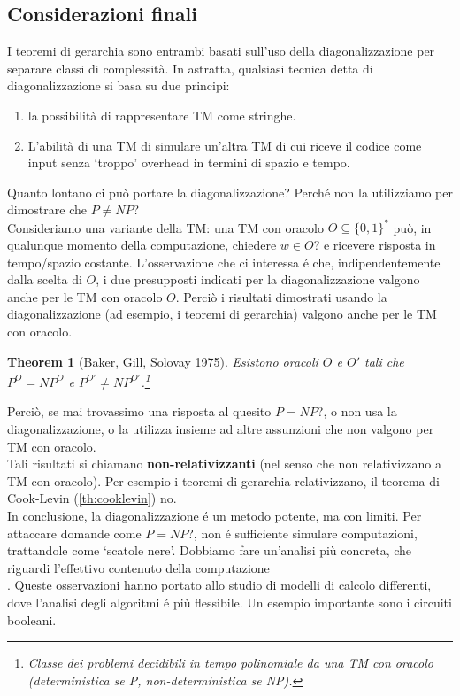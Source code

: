 \documentclass[a4paper, 12pt]{article}
\newtheorem{theorem}{Theorem}[section]
\begin{document}
\subsection{Considerazioni finali}
I teoremi di gerarchia sono entrambi basati sull’uso della diagonalizzazione per separare classi di complessità. In astratta, qualsiasi tecnica detta di diagonalizzazione si basa su due principi:
\begin{enumerate}
\item la possibilità di rappresentare TM come stringhe.
\item L’abilità di una TM di simulare un’altra TM di cui riceve il codice come input senza `troppo’ overhead in termini di spazio e tempo.
\end{enumerate}
Quanto lontano ci può portare la diagonalizzazione? Perché non la utilizziamo per dimostrare che $P \neq NP$?\\
Consideriamo una variante della TM: una TM con oracolo $O \subseteq \{0,1\}^{*}$ può, in qualunque momento della computazione, chiedere $w \in O?$ e ricevere risposta in tempo/spazio costante. L’osservazione che ci interessa é che, indipendentemente dalla scelta di $O$, i due presupposti indicati per la
diagonalizzazione valgono anche per le TM con oracolo $O$. Perciò i risultati dimostrati usando la diagonalizzazione (ad esempio, i teoremi di gerarchia) valgono anche per le TM con oracolo.
\begin{theorem}[Baker, Gill, Solovay 1975]
Esistono oracoli $O$ e $O'$ tali che $P^{O}=NP^{O}$ e $P^{O'} \neq NP^{O'}$.\footnote{Classe dei problemi decidibili in tempo polinomiale da una TM con oracolo (deterministica se P, non-deterministica se NP).}
\end{theorem}
Perciò, se mai trovassimo una risposta al quesito $P=NP$?, o non usa la diagonalizzazione, o la utilizza insieme ad altre assunzioni che non valgono per TM con oracolo.\\
Tali risultati si chiamano \textbf{non-relativizzanti} (nel senso che non relativizzano a TM con oracolo). Per esempio i teoremi di gerarchia relativizzano, il teorema di Cook-Levin (\ref{th:cooklevin}) no.\\
In conclusione, la diagonalizzazione é un metodo potente,
ma con limiti. Per attaccare domande come $P=NP$?, non é sufficiente simulare computazioni, trattandole come ‘scatole nere’. Dobbiamo fare un’analisi più concreta, che riguardi l’effettivo contenuto della computazione\\.
Queste osservazioni hanno portato allo studio di modelli di calcolo differenti, dove l’analisi degli algoritmi é più flessibile. Un esempio importante sono i circuiti booleani.
\newpage
\end{document}

